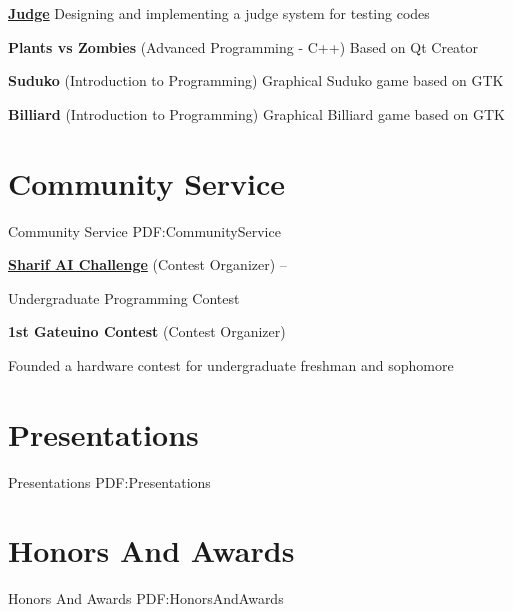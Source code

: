 \documentclass[a4paper,9pt,oneside]{article}
\begin{document}
\begin{body}
\BulletItem
\href{https://github.com/Rmin1995/Judge}
{\textbf{Judge}}
\hfill
{}
\SubBulletItem
Designing and implementing a judge system for testing codes

\BulletItem
\textbf{Plants vs Zombies} (Advanced Programming - C++)
\hfill
{}
\SubBulletItem
Based on Qt Creator

\BulletItem
\textbf{Suduko} (Introduction to Programming)
\hfill
{}
\SubBulletItem
Graphical Suduko game based on GTK

\BulletItem
\textbf{Billiard} (Introduction to Programming)
\hfill
{}
\SubBulletItem
Graphical Billiard game based on GTK

\section
{Community Service}
{Community Service}
{PDF:CommunityService}

\BulletItem
\href{https://github.com/SharifAIChallenge}{
\textbf{Sharif AI Challenge}} (Contest Organizer)
\hfill
{} --

\SubBulletItem
Undergraduate Programming Contest

\BulletItem
\textbf{1st Gateuino Contest} (Contest Organizer)
\hfill
{}

\SubBulletItem
Founded a hardware contest for undergraduate freshman and sophomore

\section
{Presentations}
{Presentations}
{PDF:Presentations}



\section
{Honors\newline
And\newline
Awards}
{Honors\newline
And\newline
Awards}
{PDF:HonorsAndAwards}


\end{body}
\end{document}
